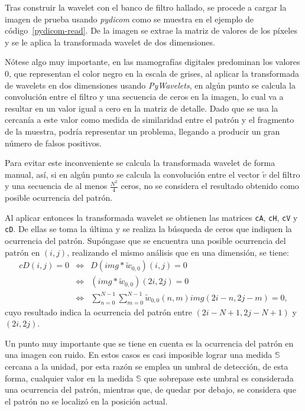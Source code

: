 \par Tras construir la wavelet con el banco de filtro hallado, se procede a cargar la imagen de prueba usando \textit{pydicom} como se muestra en el ejemplo de c\'odigo~\ref{pydicom-read}. De la imagen se extrae la matriz de valores de los p\'ixeles y se le aplica la transformada wavelet de dos dimensiones.
\par N\'otese algo muy importante, en las mamograf\'ias digitales predominan los valores 0, que representan el color negro en la escala de grises, al aplicar la transformada de wavelets en dos dimensiones usando \textit{PyWavelets}, en alg\'un punto se calcula la convoluci\'on entre el filtro y una secuencia de ceros en la imagen, lo cual va a resultar en un valor igual a cero en la matriz de detalle. Dado que se usa la cercan\'ia a este valor como medida de similaridad entre el patr\'on y el fragmento de la muestra, podr\'ia representar un problema, llegando a producir un gran n\'umero de falsos positivos.
\par Para evitar este inconveniente se calcula la transformada wavelet de forma manual, as\'i, si en alg\'un punto se calcula la convoluci\'on entre el vector $\tilde{v}$ del filtro y una secuencia de al menos $\frac{N^2}{4}$ ceros, no se considera el resultado obtenido como posible ocurrencia del patr\'on.\\

\par Al aplicar entonces la transformada wavelet se obtienen las matrices \texttt{cA}, \texttt{cH}, \texttt{cV} y \texttt{cD}. De ellas se toma la \'ultima y se realiza la b\'usqueda de ceros que indiquen la ocurrencia del patr\'on. Sup\'ongase que se encuentra una posible ocurrencia del patr\'on en $(i,j)$, realizando el mismo an\'alisis que en una dimensi\'on, se tiene:
\begin{eqnarray}
cD(i,j)=0&\Leftrightarrow&D(img\ast\tilde{w}_{0,0})(i,j)=0\nonumber\\
&\Leftrightarrow&(img\ast\tilde{w}_{0,0})(2i,2j)=0\nonumber\\
&\Leftrightarrow&\sum_{n=0}^{N-1}\sum_{m=0}^{N-1}\tilde{w}_{0,0}(n,m)img(2i-n,2j-m)=0,\nonumber
\end{eqnarray}
cuyo resultado indica la ocurrencia del patr\'on entre $(2i-N+1,2j-N+1)$ y $(2i,2j)$.

\par Un punto muy importante que se tiene en cuenta es la ocurrencia del patr\'on en una imagen con ruido. En estos casos es casi imposible lograr una medida $\mathbb{S}$ cercana a la unidad, por esta raz\'on se emplea un umbral de detecci\'on, de esta forma, cualquier valor en la medida $\mathbb{S}$ que sobrepase este umbral es considerada una ocurrencia del patr\'on, mientras que, de quedar por debajo, se considera que el patr\'on no se localiz\'o en la posici\'on actual.\\

